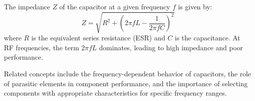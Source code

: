The impedance \( Z \) of the capacitor at a given frequency \( f \) is given by:
\[
Z = \sqrt{R^2 + \left(2\pi fL - \frac{1}{2\pi fC}\right)^2}
\]
where \( R \) is the equivalent series resistance (ESR) and \( C \) is the capacitance. At RF frequencies, the term \( 2\pi fL \) dominates, leading to high impedance and poor performance.

Related concepts include the frequency-dependent behavior of capacitors, the role of parasitic elements in component performance, and the importance of selecting components with appropriate characteristics for specific frequency ranges.

